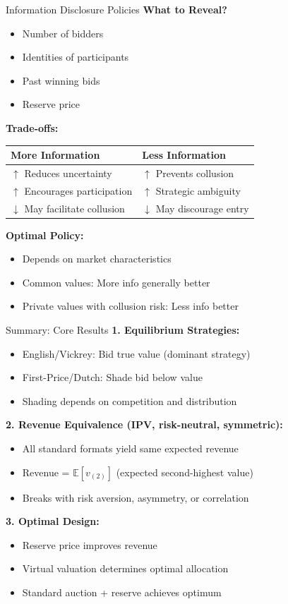 \documentclass[xcolor={x11names}]{beamer}
\newcommand{\E}{\mathbb{E}}
\begin{document}
\begin{frame}{Information Disclosure Policies}
\textbf{What to Reveal?}
\begin{itemize}
  \item Number of bidders
  \item Identities of participants
  \item Past winning bids
  \item Reserve price
\end{itemize}

\textbf{Trade-offs:}

\begin{tabular}{ll}
\toprule
\textbf{More Information} & \textbf{Less Information} \\
\midrule
$\uparrow$ Reduces uncertainty & $\uparrow$ Prevents collusion \\
$\uparrow$ Encourages participation & $\uparrow$ Strategic ambiguity \\
$\downarrow$ May facilitate collusion & $\downarrow$ May discourage entry \\
\bottomrule
\end{tabular}


\textbf{Optimal Policy:}
\begin{itemize}
  \item Depends on market characteristics
  \item Common values: More info generally better
  \item Private values with collusion risk: Less info better
\end{itemize}
\end{frame}


\begin{frame}{Summary: Core Results}
\textbf{1. Equilibrium Strategies:}
\begin{itemize}
  \item English/Vickrey: Bid true value (dominant strategy)
  \item First-Price/Dutch: Shade bid below value
  \item Shading depends on competition and distribution
\end{itemize}

\textbf{2. Revenue Equivalence (IPV, risk-neutral, symmetric):}
\begin{itemize}
  \item All standard formats yield same expected revenue
  \item Revenue = $\E[v_{(2)}]$ (expected second-highest value)
  \item Breaks with risk aversion, asymmetry, or correlation
\end{itemize}

\textbf{3. Optimal Design:}
\begin{itemize}
  \item Reserve price improves revenue
  \item Virtual valuation determines optimal allocation
  \item Standard auction + reserve achieves optimum
\end{itemize}
\end{frame}
\end{document}
